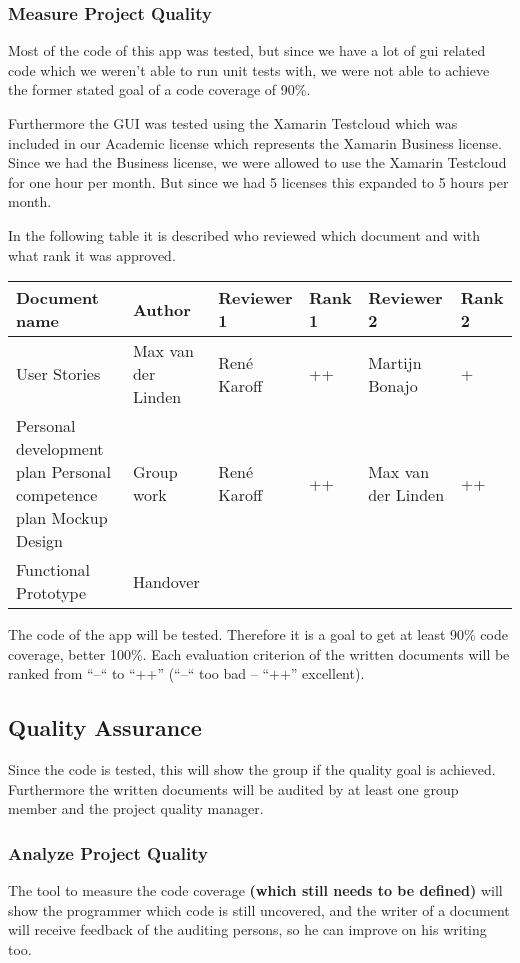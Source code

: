 \subsubsection{Measure Project Quality}
Most of the code of this \gls{app} was tested, but since we have a lot of \gls{gui} related code which we weren't able to run unit tests with, we were not able to achieve the former stated goal of a code coverage of 90\%.

Furthermore the GUI was tested using the Xamarin Testcloud which was included in our Academic license which represents the Xamarin Business license. Since we had the Business license, we were allowed to use the Xamarin Testcloud for one hour per month. But since we had 5 licenses this expanded to 5 hours per month.

In the following table it is described who reviewed which document and with what rank it was approved.
\begin{table}[htbp]
	\begin{tabular}{ p{\textwidth} p{\textwidth} p{\textwidth} p{\textwidth} p{\textwidth} p{\textwidth} }
		\textbf{Document name} & \textbf{Author} & \textbf{Reviewer 1} & \textbf{Rank 1} & \textbf{Reviewer 2} & \textbf{Rank 2}\\ \hline
		User Stories & Max van der Linden & René Karoff & ++ & Martijn Bonajo & + \\
		Personal development plan
		Personal competence plan
		Mockup Design & Group work & René Karoff & ++ & Max van der Linden & ++ \\
		Functional Prototype &
		Handover
	\end{tabular}
\end{table}

The code of the \gls{app} will be tested. Therefore it is a goal to get at least 90\% code coverage, better 100\%. Each evaluation criterion of the written documents will be ranked from “--“ to “++” (“--“ too bad – “++” excellent).

\subsection{Quality Assurance}
Since the code is tested, this will show the group if the quality goal is achieved. Furthermore the written documents will be audited by at least one group member and the project quality manager.
\subsubsection{Analyze Project Quality}
The tool to measure the code coverage \textbf{(which still needs to be defined)} will show the programmer which code is still uncovered, and the writer of a document will receive feedback of the auditing persons, so he can improve on his writing too.
